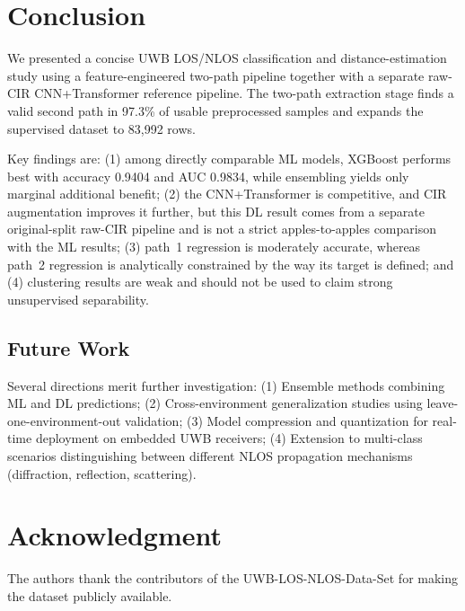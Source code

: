 \documentclass[conference]{IEEEtran}
\begin{document}
\section{Conclusion}

We presented a concise UWB LOS/NLOS classification and distance-estimation study using a feature-engineered two-path pipeline together with a separate raw-CIR CNN+Transformer reference pipeline. The two-path extraction stage finds a valid second path in 97.3\% of usable preprocessed samples and expands the supervised dataset to 83,992 rows.

Key findings are: (1) among directly comparable ML models, XGBoost performs best with accuracy 0.9404 and AUC 0.9834, while ensembling yields only marginal additional benefit; (2) the CNN+Transformer is competitive, and CIR augmentation improves it further, but this DL result comes from a separate original-split raw-CIR pipeline and is not a strict apples-to-apples comparison with the ML results; (3) path~1 regression is moderately accurate, whereas path~2 regression is analytically constrained by the way its target is defined; and (4) clustering results are weak and should not be used to claim strong unsupervised separability.

\subsection{Future Work}

Several directions merit further investigation: (1) Ensemble methods combining ML and DL predictions; (2) Cross-environment generalization studies using leave-one-environment-out validation; (3) Model compression and quantization for real-time deployment on embedded UWB receivers; (4) Extension to multi-class scenarios distinguishing between different NLOS propagation mechanisms (diffraction, reflection, scattering).

\section*{Acknowledgment}

The authors thank the contributors of the UWB-LOS-NLOS-Data-Set for making the dataset publicly available.
\end{document}
